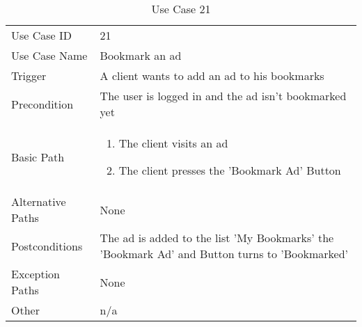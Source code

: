 \begin{table}[H]
\centering
\label{table-use-case-21}
\begin{tabular}{|p{3cm}|p{10cm}}
Use Case ID       & 21                                                           
\\
Use Case Name     & Bookmark an ad                                                          
\\
Trigger           & A client wants to add an ad to his bookmarks                                           
\\
Precondition      & The user is logged in and the ad isn't bookmarked yet                                                 
\\
Basic Path        & \begin{enumerate}
\item The client visits an ad
\item The client presses the 'Bookmark Ad' Button
\end{enumerate} 
     \\
Alternative Paths & None                          \\
Postconditions    & The ad is added to the list 'My Bookmarks' the 'Bookmark Ad'
and Button turns to 'Bookmarked'
\\
Exception Paths   & None                          \\
Other             & n/a                                                                                                                                                                                                        
\end{tabular}
\caption{Use Case 21}
\end{table}

